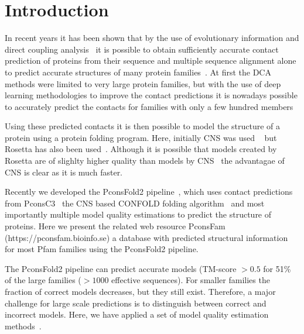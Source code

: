 \documentclass[a4,center,fleqn]{NAR}
\begin{document}
\section{Introduction}

In recent years it has been shown that by the use of evolutionary
information and direct coupling analysis~\cite{Weigt19116270} it is
possible to obtain sufficiently accurate contact prediction of
proteins from their sequence and multiple sequence alignment alone to
predict accurate structures of many protein
families~\cite{Sulkowska2012}. At first the DCA methods were limited
to very large protein families, but with the use of deep learning
methodologies to improve the contact predictions it is nowadays
possible to accurately predict the contacts for families with only a
few hundred members~\cite{Skwark25375897,Michel28535189,Wang28056090}

Using these predicted contacts it is then possible to model the
structure of a protein using a protein folding program. Here,
initially CNS was used ~\cite{Morcos22106262} but Rosetta has also
been used~\cite{Baker:1999}. Although it is possible that models
created by Rosetta are of slighlty higher quality than models by
CNS~\cite{Michel25161237} the advantagae of CNS is clear as it is much
faster. 

Recently we developed the PconsFold2 pipeline~\cite{Michel28881974}, which uses contact
predictions from PconsC3~\cite{Michel28535189} the CNS based CONFOLD folding
algorithm~\cite{Adhikari25974172} and most importantly multiple model quality estimations
\cite{Uziela28052925,Lundstrom:2001} to predict the structure of
proteins. Here we present the related web resource PconsFam
(https://pconsfam.bioinfo.se) a database with predicted structural
information for most Pfam families using the PconsFold2
pipeline.

The PconsFold2 pipeline can predict accurate models (TM-score $>0.5$
for 51\% of the large families ($>1000$ effective sequences). For
smaller families the fraction of correct models decreases, but they
still exist. Therefore, a major challenge for large scale predictions
is to distinguish between correct and incorrect models. Here, we have
applied a set of model quality estimation methods~\cite{Kryshtafovych28833563}.
\end{document}
